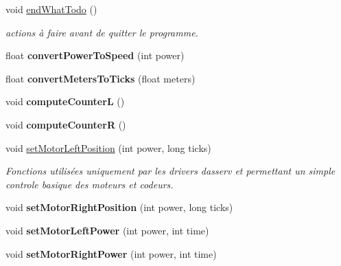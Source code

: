 \begin{DoxyCompactItemize}
void \hyperlink{classAsservDriver_a636bf5413d2cf0419f188a4965340758}{end\+What\+Todo} ()
\begin{DoxyCompactList}\small\item\em actions à faire avant de quitter le programme. \end{DoxyCompactList}\item 
\mbox{\label{classAsservDriver_a10895a322108211299951538aa2ff614}} 
float {\bfseries convert\+Power\+To\+Speed} (int power)
\item 
\mbox{\label{classAsservDriver_aa1febcc45f372e9f0f39bad03a09ebad}} 
float {\bfseries convert\+Meters\+To\+Ticks} (float meters)
\item 
\mbox{\label{classAsservDriver_a8b02e6ec0a124ca9178f17c829d48513}} 
void {\bfseries compute\+CounterL} ()
\item 
\mbox{\label{classAsservDriver_af852b42fef0dbd773141d5e5fd0a74f6}} 
void {\bfseries compute\+CounterR} ()
\item 
\mbox{\label{classAsservDriver_a49dad05da23fe62aa4bf582199eaa3a6}} 
void \hyperlink{classAsservDriver_a49dad05da23fe62aa4bf582199eaa3a6}{set\+Motor\+Left\+Position} (int power, long ticks)
\begin{DoxyCompactList}\small\item\em Fonctions utilisées uniquement par les drivers d\textquotesingle{}asserv et permettant un simple controle basique des moteurs et codeurs. \end{DoxyCompactList}\item 
\mbox{\label{classAsservDriver_a62a57e92e4933413d9c3c6b62f496ef3}} 
void {\bfseries set\+Motor\+Right\+Position} (int power, long ticks)
\item 
\mbox{\label{classAsservDriver_a3b702233fa09a657bb03372470152376}} 
void {\bfseries set\+Motor\+Left\+Power} (int power, int time)
\item 
\mbox{\label{classAsservDriver_a54e742670bae9a19dc70b982cad4c3ba}} 
void {\bfseries set\+Motor\+Right\+Power} (int power, int time)
\item 

\end{DoxyCompactItemize}

